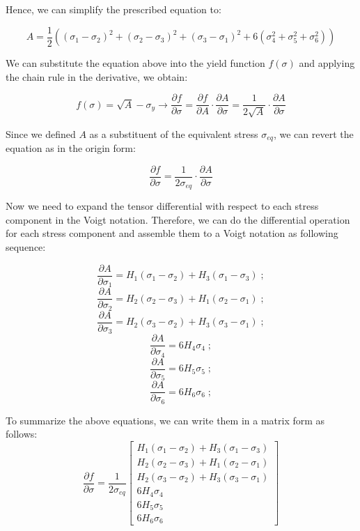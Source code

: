 \documentclass[12pt]{article}
\begin{document}
Hence, we can simplify the prescribed equation to:

\begin{equation}
A = \frac{1}{2} \left( (\sigma_1 - \sigma_2)^2 + (\sigma_2 - \sigma_3)^2 + (\sigma_3 - \sigma_1)^2 + 6(\sigma_4^2 + \sigma_5^2 + \sigma_6^2) \right)
\end{equation}

We can substitute the equation above into the yield function $f(\sigma)$ and applying the chain rule in the 
derivative, we obtain:

\begin{equation}
f(\sigma) = \sqrt{A} - \sigma_y \rightarrow \frac{\partial{f}}{\partial{\sigma}} = \frac{\partial{f}}{\partial{A}} \cdot \frac{\partial{A}}{\partial{\sigma}} = \frac{1}{2\sqrt{A}} \cdot \frac{\partial{A}}{\partial{\sigma}}
\end{equation}

Since we defined $A$ as a substituent of the equivalent stress $\sigma_{eq}$, we can revert the equation as in the origin form:

\begin{equation}
    \frac{\partial{f}}{\partial{\sigma}} = \frac{1}{2\sigma_{eq}} \cdot \frac{\partial{A}}{\partial{\sigma}}
\end{equation}

Now we need to expand the tensor differential with respect to each stress component in 
the Voigt notation. Therefore, we can do the differential operation for each stress 
component and assemble them to a Voigt notation as following sequence:

\[
\frac{\partial{A}}{\partial{\sigma_1}} = H_{1}(\sigma_1-\sigma_2) + H_3(\sigma_1-\sigma_3) \;;
\]
\[
\frac{\partial{A}}{\partial{\sigma_2}} = H_{2}(\sigma_2-\sigma_3) + H_1(\sigma_2-\sigma_1) \;;
\]
\[
\frac{\partial{A}}{\partial{\sigma_3}} = H_{2}(\sigma_3-\sigma_2) + H_3(\sigma_3-\sigma_1) \;;
\]
\[
\frac{\partial{A}}{\partial{\sigma_4}} = 6H_{4}\sigma_4 \;;
\]
\[
\frac{\partial{A}}{\partial{\sigma_5}} = 6H_{5}\sigma_5 \;;
\]
\[
\frac{\partial{A}}{\partial{\sigma_6}} = 6H_{6}\sigma_6 \;;
\]

To summarize the above equations, we can write them in a matrix form as follows:
\begin{equation}
\frac{\partial{f}}{\partial{\sigma}} = \frac{1}{2\sigma_{eq}}\begin{bmatrix}
H_{1}(\sigma_1-\sigma_2) + H_3(\sigma_1-\sigma_3) \\    
H_{2}(\sigma_2-\sigma_3) + H_1(\sigma_2-\sigma_1) \\
H_{2}(\sigma_3-\sigma_2) + H_3(\sigma_3-\sigma_1) \\
6H_{4}\sigma_4 \\
6H_{5}\sigma_5 \\
6H_{6}\sigma_6
\end{bmatrix}
\end{equation}
\end{document}
